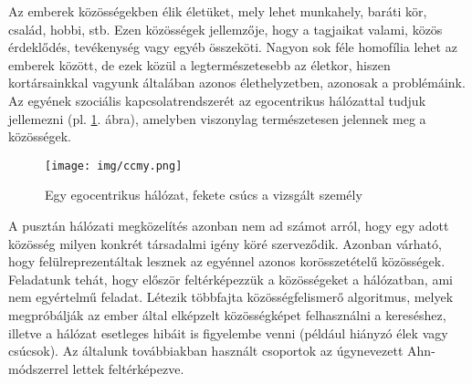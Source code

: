 \documentclass[12pt]{article}
\begin{document}
Az emberek közösségekben élik életüket, mely lehet munkahely, baráti kör, család, hobbi, stb. Ezen közösségek jellemzője, hogy a tagjaikat valami, közös érdeklődés, tevékenység vagy egyéb összeköti. %
Nagyon sok féle homofília lehet az emberek között, de ezek közül a legtermészetesebb az életkor, hiszen kortársainkkal vagyunk általában azonos élethelyzetben, azonosak a problémáink. Az egyének szociális kapcsolatrendszerét az egocentrikus hálózattal tudjuk jellemezni (pl. \ref{egocentrikus}. ábra), amelyben viszonylag természetesen jelennek meg a közösségek.
\begin{figure}[H]
	\centering
	\texttt{[image: img/ccmy.png]}
	\caption{Egy egocentrikus hálózat, fekete csúcs a vizsgált személy} %
	\label{egocentrikus}
\end{figure}
A pusztán hálózati megközelítés azonban nem ad számot arról, hogy egy adott közösség milyen konkrét társadalmi igény köré szerveződik. Azonban várható, hogy felülreprezentáltak lesznek az egyénnel azonos korösszetételű közösségek.
Feladatunk tehát, hogy először feltérképezzük a közösségeket a hálózatban, ami nem egyértelmű feladat. Létezik \iffalse TODO: létezik helyett valami más szó \fi többfajta közösségfelismerő algoritmus, melyek megpróbálják az ember által elképzelt közösségképet felhasználni a kereséshez, illetve a hálózat esetleges hibáit is figyelembe venni (például hiányzó élek vagy csúcsok). Az általunk továbbiakban használt csoportok az úgynevezett Ahn-módszerrel \cite{ahn2010link} \iffalse TODO: kell ez? \fi lettek feltérképezve.
\end{document}
